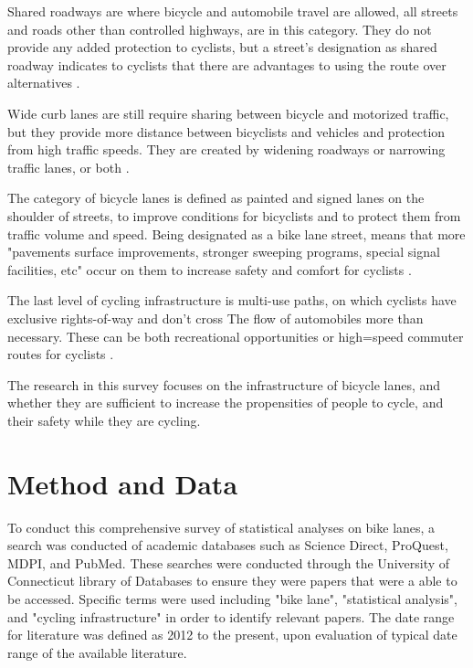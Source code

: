 \documentclass[12pt, letterpaper]{article}
\begin{document}
Shared roadways are where bicycle and automobile travel are allowed, all streets and roads other than controlled highways, are in this category. They do not provide any added protection to cyclists, but a street's designation as shared roadway indicates to cyclists that there are advantages to using the route over alternatives \cite{CTDOT2023}. \par 
Wide curb lanes are still require sharing between bicycle and motorized traffic, but they provide more distance between bicyclists and vehicles and protection from high traffic speeds. They are created by widening roadways or narrowing traffic lanes, or both \cite{CTDOT2023}.\par 
The category of bicycle lanes is defined as painted and signed lanes on the shoulder of streets, to improve conditions for bicyclists and to protect them from traffic volume and speed. Being designated as a bike lane street, means that more "pavements surface improvements, stronger sweeping programs, special signal facilities, etc" occur on them to increase safety and comfort for cyclists \cite{CTDOT2023}. \par
The last level of cycling infrastructure is multi-use paths, on which cyclists have exclusive rights-of-way and don't cross The flow of automobiles more than necessary. These can be both recreational opportunities or high=speed commuter routes for cyclists \cite{CTDOT2023}. \par
The research in this survey focuses on the infrastructure of bicycle lanes, and whether they are sufficient to increase the propensities of people to cycle, and their safety while they are cycling. 


\section{Method and Data}
\label{sec:methodanddata}

To conduct this comprehensive survey of statistical analyses on bike lanes, a search was conducted of academic databases such as Science Direct, ProQuest, MDPI, and PubMed. These searches were conducted through the University of Connecticut library of Databases to ensure they were papers that were a able to be accessed. Specific terms were used including "bike lane", "statistical analysis", and "cycling infrastructure" in order to identify relevant papers. The date range for literature was defined as 2012 to the present, upon evaluation of typical date range of the available literature. \par
\end{document}
